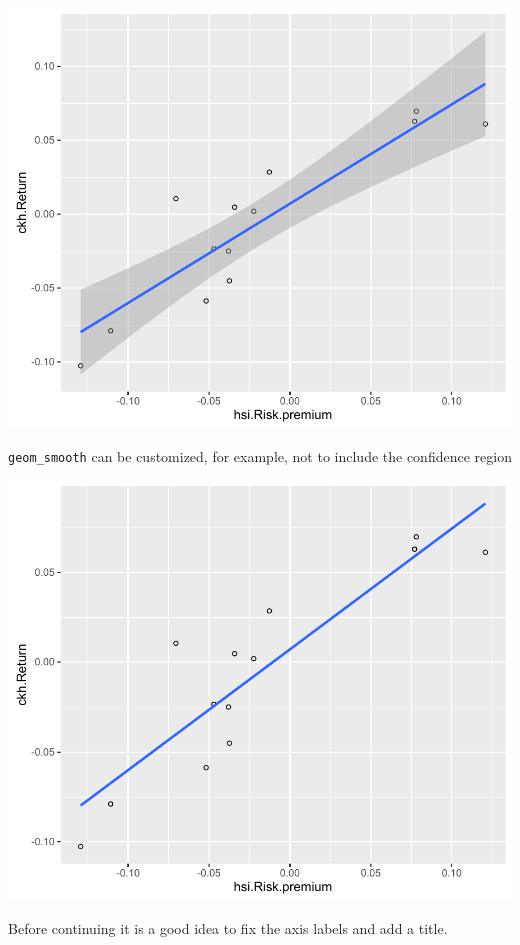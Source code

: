 \begin{center}\includegraphics[width=0.6\linewidth]{11_Linear_Regression_Plot_pdf/lr_6-1} \end{center}

\texttt{geom\_smooth} can be customized, for example, not to include the
confidence region

\begin{Shaded}
\begin{Highlighting}[]
\StringTok{ }\NormalTok{(}
\StringTok{  }\NormalTok{(}\NormalTok{) +}\StringTok{ }\NormalTok{(}\NormalTok{) }
\end{Highlighting}
\end{Shaded}

\begin{center}\includegraphics[width=0.6\linewidth]{11_Linear_Regression_Plot_pdf/lr_7-1} \end{center}

Before continuing it is a good idea to fix the axis labels and add a
title.

